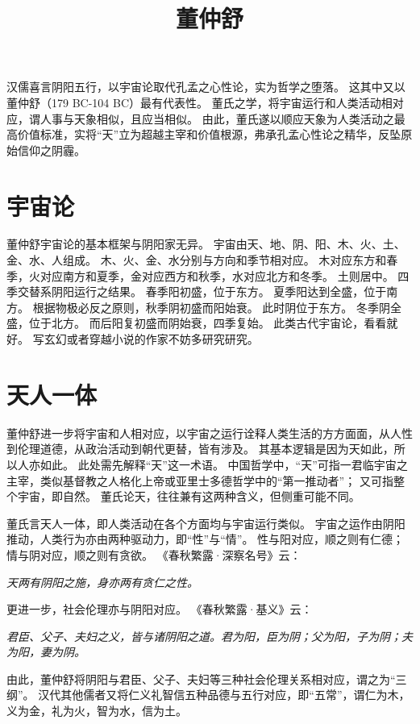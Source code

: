 \documentclass[11pt]{article}
\title{董仲舒}
\date{}
\begin{document}
  \maketitle

  \linenumbers 
汉儒喜言阴阳五行，以宇宙论取代孔孟之心性论，实为哲学之堕落。
这其中又以董仲舒（179 BC-104 BC）最有代表性。
董氏之学，将宇宙运行和人类活动相对应，谓人事与天象相似，且应当相似。
由此，董氏遂以顺应天象为人类活动之最高价值标准，实将“天”立为超越主宰和价值根源，弗承孔孟心性论之精华，反坠原始信仰之阴霾。

\section{宇宙论}
董仲舒宇宙论的基本框架与阴阳家无异。
宇宙由天、地、阴、阳、木、火、土、金、水、人组成。
木、火、金、水分别与方向和季节相对应。
木对应东方和春季，火对应南方和夏季，金对应西方和秋季，水对应北方和冬季。
土则居中。
四季交替系阴阳运行之结果。
春季阳初盛，位于东方。
夏季阳达到全盛，位于南方。
根据物极必反之原则，秋季阴初盛而阳始衰。
此时阴位于东方。
冬季阴全盛，位于北方。
而后阳复初盛而阴始衰，四季复始。
此类古代宇宙论，看看就好。
写玄幻或者穿越小说的作家不妨多研究研究。

\section{天人一体}
董仲舒进一步将宇宙和人相对应，以宇宙之运行诠释人类生活的方方面面，从人性到伦理道德，从政治活动到朝代更替，皆有涉及。
其基本逻辑是因为天如此，所以人亦如此。
此处需先解释“天”这一术语。
中国哲学中，“天”可指一君临宇宙之主宰，类似基督教之人格化上帝或亚里士多德哲学中的“第一推动者”；
又可指整个宇宙，即自然。
董氏论天，往往兼有这两种含义，但侧重可能不同。

\par

董氏言天人一体，即人类活动在各个方面均与宇宙运行类似。
宇宙之运作由阴阳推动，人类行为亦由两种驱动力，即“性”与“情”。
性与阳对应，顺之则有仁德；
情与阴对应，顺之则有贪欲。
《春秋繁露·深察名号》云：

\textit{天两有阴阳之施，身亦两有贪仁之性。}

更进一步，社会伦理亦与阴阳对应。
《春秋繁露·基义》云：

\textit{君臣、父子、夫妇之义，皆与诸阴阳之道。君为阳，臣为阴；父为阳，子为阴；夫为阳，妻为阴。}

由此，董仲舒将阴阳与君臣、父子、夫妇等三种社会伦理关系相对应，谓之为“三纲”。
汉代其他儒者又将仁义礼智信五种品德与五行对应，即“五常”，谓仁为木，义为金，礼为火，智为水，信为土。
\end{document}
